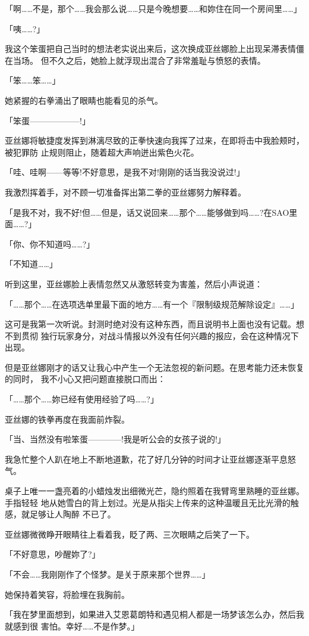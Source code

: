 \documentclass[11pt]{book}
\begin{document}
「啊……不是，那个……我会那么说……只是今晚想要……和妳住在同一个房间里……」

「咦……?」

我这个笨蛋把自己当时的想法老实说出来后，这次换成亚丝娜脸上出现呆滞表情僵在当场。
但不久之后，她脸上就浮现出混合了非常羞耻与愤怒的表情。

「笨……笨……」

她紧握的右拳涌出了眼睛也能看见的杀气。

「笨蛋——————!」

亚丝娜将敏捷度发挥到淋漓尽致的正拳快速向我挥了过来，在即将击中我脸颊时，被犯罪防
止规则阻止，随着超大声响迸出紫色火花。

「哇、哇啊——等等!不好意思，是我不对!刚刚的话当我没说过!」

我激烈挥着手，对不顾一切准备挥出第二拳的亚丝娜努力解释着。

「是我不对，我不好!但……但是，话又说回来……那个……能够做到吗……?在SAO里
面……?」

「你、你不知道吗……?」

「不知道……」

听到这里，亚丝娜脸上表情忽然又从激怒转变为害羞，然后小声说道：

「……那个……在选项选单里最下面的地方……有一个『限制级规范解除设定』……」

这可是我第一次听说。封测时绝对没有这种东西，而且说明书上面也没有记载。想不到贯彻
独行玩家身分，对战斗情报以外没有任何兴趣的报应，会在这种情况下出现。

但是亚丝娜刚才的话又让我心中产生一个无法忽视的新问题。在思考能力还未恢复的同时，
我不小心又把问题直接脱口而出：

「……那个……妳已经有使用经验了吗……?」

亚丝娜的铁拳再度在我面前炸裂。

「当、当然没有啦笨蛋————!我是听公会的女孩子说的!」

我急忙整个人趴在地上不断地道歉，花了好几分钟的时间才让亚丝娜逐渐平息怒气。

桌子上唯一一盏亮着的小蜡烛发出细微光芒，隐约照着在我臂弯里熟睡的亚丝娜。手指轻轻
地从她雪白的背上划过。光是从指尖上传来的这种温暖且无比光滑的触感，就足够让人陶醉
不已了。

亚丝娜微微睁开眼睛往上看着我，眨了两、三次眼睛之后笑了一下。

「不好意思，吵醒妳了?」

「不会……我刚刚作了个怪梦。是关于原来那个世界……」

她保持着笑容，将脸埋在我胸前。

「我在梦里面想到，如果进入艾恩葛朗特和遇见桐人都是一场梦该怎么办，然后我就感到很
害怕。幸好……不是作梦。」
\end{document}
